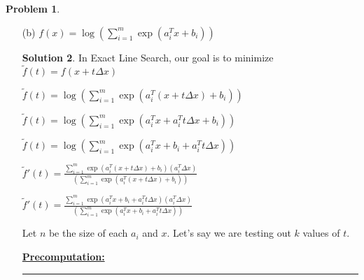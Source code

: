 \documentclass{article}
\theoremstyle{definition}
\newtheorem{problem}{Problem}
\def\fline{\rule{0.75\linewidth}{0.5pt}}
\newcommand{\finishline}{\begin{center}\fline\end{center}}
\newtheorem*{solution*}{Solution}
\newenvironment{solution}{\begin{solution*}}{{\finishline} \end{solution*}}
\begin{document}
\begin{problem}
\begin{enumerate}
\begin{solution}
Since we are testing out $k$ values of $t$, the Line Search Algorithm will be $O(mk)$ \newline 
Including pre-computation, it takes $O(mk) + O(mn)$ \newline 

\textbf{\underline{Cost with Precomputation($\tilde{f}'(t)$):}} \newline 
Computing $\frac{- a_i^T \Delta x}{\log{(b_i - a_i^Tx - a_i^T t \Delta x))}}$ takes $O(1)$ operations.

$\sum_{i=1}^{m} \frac{- a_i^T \Delta x}{\log{(b_i - a_i^Tx - a_i^T t \Delta x))}}$ takes $O(m)$ operations. 

$- \sum_{i=1}^{m} \frac{- a_i^T \Delta x}{\log{(b_i - a_i^Tx - a_i^T t \Delta x))}}$ takes $O(m)$ operations. 


Since we are testing out $k$ values of $t$, the Line Search Algorithm will be $O(mk)$ \newline 
Including pre-computation, it takes $O(mk) + O(mn)$ \newline 

    \end{solution}
 
    \item[(b)] $f(x) = \log(\sum_{i=1}^{m} \exp(a_i^Tx + b_i))$ 

    \begin{solution}
         In Exact Line Search, our goal is to minimize $\tilde{f}(t) =  f(x + t\Delta x)$

         $\tilde{f}(t) =  \log(\sum_{i=1}^{m} \exp(a_i^T(x + t\Delta x) + b_i))$ \newline 

         $\tilde{f}(t) =  \log(\sum_{i=1}^{m} \exp(a_i^Tx + a_i^T t\Delta x + b_i))$

        $\tilde{f}(t) =  \log(\sum_{i=1}^{m} \exp(a_i^Tx + b_i + a_i^T t\Delta x))$


        $\tilde{f}'(t) =  \frac{\sum_{i=1}^{m} \exp(a_i^T(x + t\Delta x) + b_i) (a_i^T \Delta x)}{(\sum_{i=1}^{m} \exp(a_i^T(x + t\Delta x) + b_i))}$

        
        $\tilde{f}'(t) =  \frac{\sum_{i=1}^{m} \exp(a_i^Tx + b_i + a_i^T t\Delta x) (a_i^T \Delta x)}{(\sum_{i=1}^{m} \exp(a_i^Tx + b_i + a_i^T t\Delta x))}$

        Let $n$ be the size of each $a_i$ and $x$. Let's say we are testing out $k$ values of $t$. 

        \textbf{\underline{Precomputation:}} \newline  
        

\end{solution}
\end{enumerate}
\end{problem}
\end{document}
